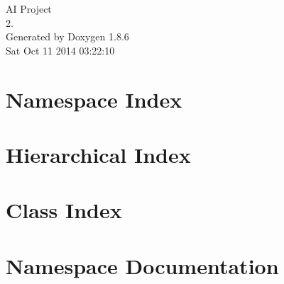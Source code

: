 \documentclass[twoside]{book}
\newcommand{\clearemptydoublepage}{%
  \newpage{\pagestyle{empty}\cleardoublepage}%
}
\begin{document}
\hypersetup{pageanchor=false}
\begin{titlepage}
\vspace*{7cm}
\begin{center}%
{\Large A\-I Project \\[1ex]\large 2. }\\
\vspace*{1cm}
{\large Generated by Doxygen 1.8.6}\\
\vspace*{0.5cm}
{\small Sat Oct 11 2014 03:22:10}\\
\end{center}
\end{titlepage}
\clearemptydoublepage
\tableofcontents
\clearemptydoublepage
{}
\hypersetup{pageanchor=true}

\chapter{Namespace Index}

\chapter{Hierarchical Index}

\chapter{Class Index}

\chapter{Namespace Documentation}

\end{document}
